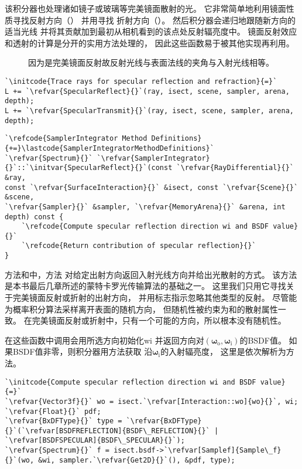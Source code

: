 该积分器也处理诸如镜子或玻璃等完美镜面散射的光。
它非常简单地利用镜面性质寻找反射方向（）
并用寻找
折射方向（）。
然后积分器会递归地跟随新方向的适当光线
并将其贡献加到最初从相机看到的该点处反射辐亮度中。
镜面反射效应和透射的计算是分开的实用方法处理的，
因此这些函数易于被其他实现再利用。
\begin{figure}[htbp]
    \centering
    \caption{因为是完美镜面反射故反射光线与表面法线的夹角与入射光线相等。}
    \label{fig:1.21}
\end{figure}
\begin{lstlisting}
`\initcode{Trace rays for specular reflection and refraction}{=}`
L += `\refvar{SpecularReflect}{}`(ray, isect, scene, sampler, arena, depth);
L += `\refvar{SpecularTransmit}{}`(ray, isect, scene, sampler, arena, depth);
\end{lstlisting}
\begin{lstlisting}
`\refcode{SamplerIntegrator Method Definitions}{+=}\lastcode{SamplerIntegratorMethodDefinitions}`
`\refvar{Spectrum}{}` `\refvar{SamplerIntegrator}{}`::`\initvar{SpecularReflect}{}`(const `\refvar{RayDifferential}{}` &ray,
const `\refvar{SurfaceInteraction}{}` &isect, const `\refvar{Scene}{}` &scene,
`\refvar{Sampler}{}` &sampler, `\refvar{MemoryArena}{}` &arena, int depth) const {
    `\refcode{Compute specular reflection direction wi and BSDF value}{}`
    `\refcode{Return contribution of specular reflection}{}`
}
\end{lstlisting}

方法和中，方法
对给定出射方向返回入射光线方向并给出光散射的方式。
该方法是本书最后几章所述的蒙特卡罗光传输算法的基础之一。
这里我们只用它寻找关于完美镜面反射或折射的出射方向，
并用标志指示忽略其他类型的反射。
尽管能
为概率积分算法采样离开表面的随机方向，
但随机性被约束为和的散射属性一致。
在完美镜面反射或折射中，只有一个可能的方向，所以根本没有随机性。

在这些函数中调用会用所选方向初始化{\ttfamily wi}
并返回方向对$({\bm \omega}_\mathrm{o},{\bm \omega}_\mathrm{i})$的BSDF值。
如果BSDF值非零，则积分器用方法获取
沿${\bm \omega}_\mathrm{i}$的入射辐亮度，
这里是依次解析为方法。
\begin{lstlisting}
`\initcode{Compute specular reflection direction wi and BSDF value}{=}`
`\refvar{Vector3f}{}` wo = isect.`\refvar[Interaction::wo]{wo}{}`, wi;
`\refvar{Float}{}` pdf;
`\refvar{BxDFType}{}` type = `\refvar{BxDFType}{}`(`\refvar[BSDFREFLECTION]{BSDF\_REFLECTION}{}` | `\refvar[BSDFSPECULAR]{BSDF\_SPECULAR}{}`);
`\refvar{Spectrum}{}` f = isect.bsdf->`\refvar[Samplef]{Sample\_f}{}`(wo, &wi, sampler.`\refvar{Get2D}{}`(), &pdf, type);
\end{lstlisting}

